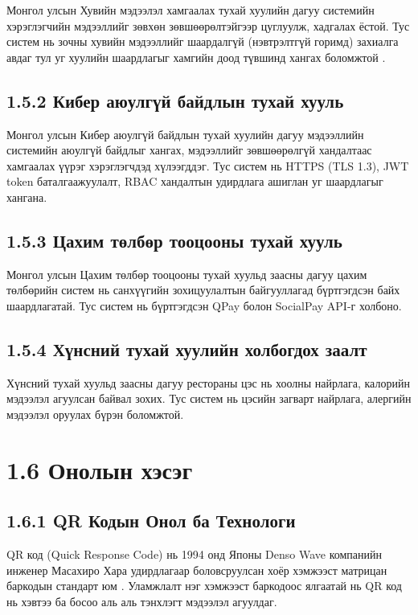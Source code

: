 Монгол улсын Хувийн мэдээлэл хамгаалах тухай хуулийн дагуу системийн хэрэглэгчийн
мэдээллийг зөвхөн зөвшөөрөлтэйгээр цуглуулж, хадгалах ёстой. Тус систем нь зочны
хувийн мэдээллийг шаардалгүй (нэвтрэлтгүй горимд) захиалга авдаг тул уг хуулийн
шаардлагыг хамгийн доод түвшинд хангах боломжтой \cite{mn_privacy2021}.

\subsection{1.5.2 Кибер аюулгүй байдлын тухай хууль}

Монгол улсын Кибер аюулгүй байдлын тухай хуулийн дагуу мэдээллийн системийн
аюулгүй байдлыг хангах, мэдээллийг зөвшөөрөлгүй хандалтаас хамгаалах үүрэг
хэрэглэгчдэд хүлээгддэг. Тус систем нь HTTPS (TLS 1.3), JWT token баталгаажуулалт,
RBAC хандалтын удирдлага ашиглан уг шаардлагыг хангана.

\subsection{1.5.3 Цахим төлбөр тооцооны тухай хууль}

Монгол улсын Цахим төлбөр тооцооны тухай хуульд заасны дагуу цахим төлбөрийн
систем нь санхүүгийн зохицуулалтын байгууллагад бүртгэгдсэн байх шаардлагатай.
Тус систем нь бүртгэгдсэн QPay болон SocialPay API-г холбоно.

\subsection{1.5.4 Хүнсний тухай хуулийн холбогдох заалт}

Хүнсний тухай хуульд заасны дагуу рестораны цэс нь хоолны найрлага, калорийн
мэдээлэл агуулсан байвал зохих. Тус систем нь цэсийн загварт найрлага, алергийн
мэдээлэл оруулах бүрэн боломжтой.

\section{1.6 Онолын хэсэг}

\subsection{1.6.1 QR Кодын Онол ба Технологи}

QR код (Quick Response Code) нь 1994 онд Японы Denso Wave компанийн инженер
Масахиро Хара удирдлагаар боловсруулсан хоёр хэмжээст матрицан баркодын стандарт
юм \cite{iso18004}. Уламжлалт нэг хэмжээст баркодоос ялгаатай нь QR код нь хэвтээ
ба босоо аль аль тэнхлэгт мэдээлэл агуулдаг.

